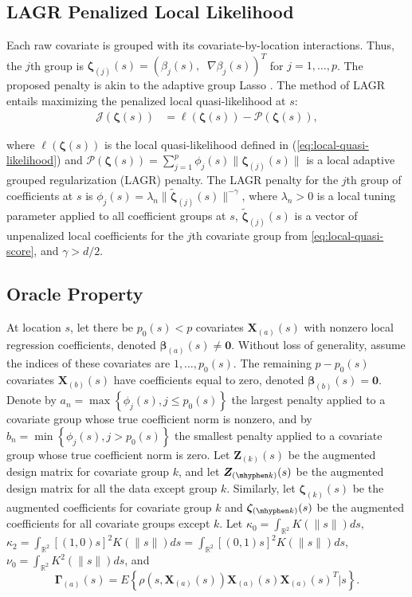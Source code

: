 \documentclass[authoryear,review, 12pt]{elsarticle}
\begin{document}
\subsection{LAGR Penalized Local Likelihood}

Each raw covariate is grouped with its covariate-by-location interactions.
Thus, the $j$th group is $\bm{\zeta}_{(j)}(s)=\left(\beta_{j}(s),\;\;\nabla \beta_{j}(s)\right)^{T}$
for $j=1,\dots,p$. The proposed penalty is akin to the adaptive
group Lasso \citep{Yuan-Lin-2006,Wang-Leng-2008}.
The method of LAGR entails maximizing the penalized local quasi-likelihood at  $s$:
\begin{align}
\mathcal{J}\left(\bm{\zeta}(s)\right) & =\ell \left(\bm{\zeta}(s)\right) - \mathcal{P} \left(\bm{\zeta}(s)\right),\label{eq:penalized-quasi-likelihood}
\end{align}

where $\ell\left(\bm{\zeta}(s)\right)$ is
the local quasi-likelihood defined in (\ref{eq:local-quasi-likelihood}) and
$\mathcal{P}\left(\bm{\zeta}(s)\right)=\sum_{j=1}^{p}\phi_{j}(s)\|\bm{\zeta}_{(j)}(s)\|$
is a local adaptive grouped regularization (LAGR) penalty. The LAGR
penalty for the $j$th group of coefficients at $s$
is $\phi_{j}(s)=\lambda_{n}\|\tilde{\bm{\zeta}}_{(j)}(s)\|^{-\gamma}$,
where $\lambda_{n}>0$ is a local tuning parameter applied to all
coefficient groups at $s$, $\tilde{\bm{\zeta}}_{(j)}(s)$
is a vector of unpenalized local coefficients for the $j$th covariate group
from \eqref{eq:local-quasi-score}, and $\gamma>d/2$.

\subsection{Oracle Property\label{sub:oracle-properties}}

At location $s$, let there be $p_{0}(s)<p$ covariates $\bm{X}_{(a)}(s)$
with nonzero local regression coefficients, denoted $\bm{\beta}_{(a)}(s)\ne\bm{0}$.
Without loss of generality, assume the indices of these covariates
are $1,\dots,p_{0}(s)$. The remaining $p-p_{0}(s)$ covariates $\bm{X}_{(b)}(s)$
have coefficients equal to zero, denoted $\bm{\beta}_{(b)}(s)=\bm{0}$.
Denote by $a_{n}=\max\left\{ \phi_{j}(s),j\le p_{0}(s)\right\} $
the largest penalty applied to a covariate group whose true coefficient
norm is nonzero, and by $b_{n}=\min\left\{ \phi_{j}(s),j>p_{0}(s)\right\} $
the smallest penalty applied to a covariate group whose true coefficient
norm is zero. Let $\bm{Z}_{(k)}(s)$ be the augmented design
matrix for covariate group $k$, and let $\bm{Z}_{(\mhyphen k)}(s)$
be the augmented design matrix for all the data except group
$k$. Similarly, let $\bm{\zeta}_{(k)}(s)$ be the augmented
coefficients for covariate group $k$ and $\bm{\zeta}_{(\mhyphen k)}(s)$
be the augmented coefficients for all covariate groups except $k$.
Let $\kappa_{0}=\int_{\mathbb{R}^{2}}K(\|s\|)ds$, $\kappa_{2}=\int_{\mathbb{R}^{2}}[(1,0)s]^{2}K(\|s\|)ds=\int_{\mathbb{R}^{2}}[(0,1)s]^{2}K(\|s\|)ds$, $\nu_{0}=\int_{\mathbb{R}^{2}}K^{2}(\|s\|)ds$, and 
\[
\bm{\Gamma}_{(a)}\left(s\right)=E\left\{ \rho\left(s,\bm{X}_{(a)}(s)\right)\bm{X}_{(a)}(s)\bm{X}_{(a)}(s)^{T}|s\right\}.
\]
\end{document}
